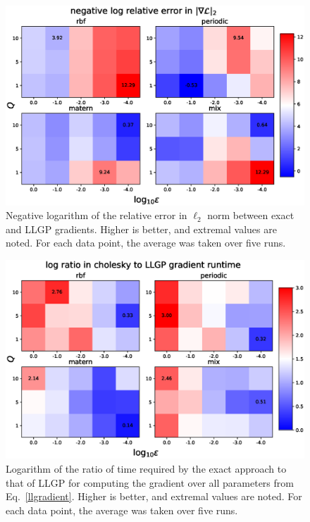 \documentclass{article}
\begin{document}
\begin{figure}[!ht]
\vskip 0.1in
\begin{center}
\centerline{\includegraphics[width=\columnwidth]{relgrad_l2.eps}}
\caption{Negative logarithm of the relative error in $\ell_2$ norm between exact and LLGP gradients. Higher is better, and extremal values are noted.  For each data point, the average was taken over five runs.}
\label{fig:relgrad}
\end{center}
\vskip -0.1in
\end{figure}

\begin{figure}[!ht]
\vskip 0.1in
\begin{center}
\centerline{\includegraphics[width=\columnwidth]{time_ratio.eps}}
\caption{Logarithm of the ratio of time required by the exact approach to that of LLGP for computing the gradient over all parameters from Eq.~\ref{llgradient}. Higher is better, and extremal values are noted. For each data point, the average was taken over five runs.}
\label{fig:gradtime}
\end{center}
\vskip -0.1in
\end{figure}
\end{document}
